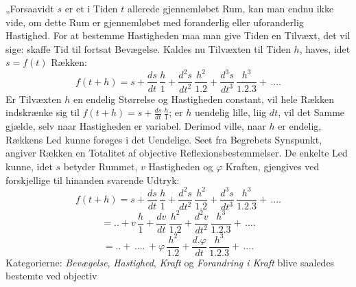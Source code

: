 \documentclass[12pt,a4paper]{book}
\begin{document}
„Forsaavidt $s$ er et i Tiden $t$ allerede gjennemløbet Rum, kan man
endnu ikke vide, om dette Rum er gjennemløbet med foranderlig eller
uforanderlig Hastighed. For at bestemme Hastigheden maa man give Tiden
en Tilvæxt, det vil sige: skaffe Tid til fortsat Bevægelse. Kaldes nu
Tilvæxten til Tiden $h$, haves, idet $s = f(t)$ Rækken:
\[ f(t + h) = s + \frac{ds}{dt}\,\frac{h}{1} +
\frac{d^{2}s}{dt^{2}}\,\frac{h^{2}}{1.2} +
\frac{d^{3}s}{dt^{3}}\,\frac{h^{3}}{1.2.3} +\,.... \]
Er Tilvæxten $h$ en endelig Størrelse og Hastigheden constant, vil
hele Rækken indskrænke sig til $f(t + h) = s + \frac{ds}{dt}\,
\frac{h}{1}$; er $h$ uendelig lille, liig $dt$, vil det Samme gjælde,
selv naar Hastigheden er variabel. Derimod ville, naar $h$ er endelig,
Rækkens Led kunne forøges i det Uendelige. Seet fra Begrebets
Synspunkt, angiver Rækken en Totalitet af objective
Reflexionsbestemmelser. De enkelte Led kunne, idet $s$ betyder Rummet,
$v$ Hastigheden og $\varphi$ Kraften, gjengives ved forskjellige til
hinanden svarende Udtryk:
\[ f(t + h) = s + \frac{ds}{dt}\,\frac{h}{1} +
\frac{d^{2}s}{dt^{2}}\,\frac{h^{2}}{1.2} +
\frac{d^{3}s}{dt^{3}}\,\frac{h^{3}}{1.2.3} +\,.... \]
\[ = .. + v\,\frac{h}{1} + \frac{dv}{dt}\,\frac{h^{2}}{1.2} +
\frac{d^{2}v}{dt^{2}}\,\frac{h^{3}}{1.2.3} +\,.... \]
\[ = .. +\,....\,+ \varphi\,\frac{h^{2}}{1.2} +
\frac{d.\varphi}{dt}\,\frac{h^{3}}{1.2.3} +\,.... \]
\setcounter{footnote}{0}
Kategorierne: \emph{Bevægelse}, \emph{Hastighed}, \emph{Kraft} og
\emph{Forandring i Kraft} blive saaledes bestemte ved objectiv
\end{document}
